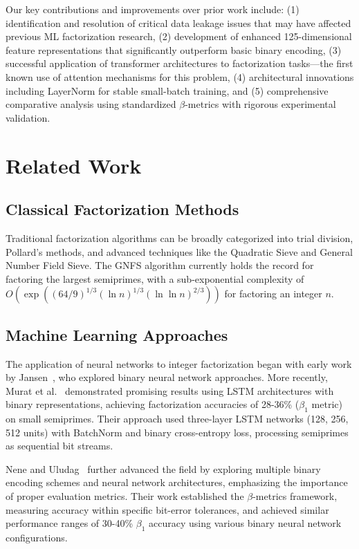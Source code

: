 \documentclass[12pt]{article}
\begin{document}
Our key contributions and improvements over prior work include: (1) identification and resolution of critical data leakage issues that may have affected previous ML factorization research, (2) development of enhanced 125-dimensional feature representations that significantly outperform basic binary encoding, (3) successful application of transformer architectures to factorization tasks—the first known use of attention mechanisms for this problem, (4) architectural innovations including LayerNorm for stable small-batch training, and (5) comprehensive comparative analysis using standardized $\beta$-metrics with rigorous experimental validation.

\section{Related Work}

\subsection{Classical Factorization Methods}

Traditional factorization algorithms can be broadly categorized into trial division, Pollard's methods, and advanced techniques like the Quadratic Sieve and General Number Field Sieve. The GNFS algorithm currently holds the record for factoring the largest semiprimes, with a sub-exponential complexity of $O(\exp((64/9)^{1/3}(\ln n)^{1/3}(\ln \ln n)^{2/3}))$ for factoring an integer $n$.

\subsection{Machine Learning Approaches}

The application of neural networks to integer factorization began with early work by Jansen~\cite{jansen2005neural}, who explored binary neural network approaches. More recently, Murat et al.~\cite{murat2020integer} demonstrated promising results using LSTM architectures with binary representations, achieving factorization accuracies of 28-36\% ($\beta_1$ metric) on small semiprimes. Their approach used three-layer LSTM networks (128, 256, 512 units) with BatchNorm and binary cross-entropy loss, processing semiprimes as sequential bit streams.

Nene and Uludag~\cite{nene2022machine} further advanced the field by exploring multiple binary encoding schemes and neural network architectures, emphasizing the importance of proper evaluation metrics. Their work established the $\beta$-metrics framework, measuring accuracy within specific bit-error tolerances, and achieved similar performance ranges of 30-40\% $\beta_1$ accuracy using various binary neural network configurations.
\end{document}

